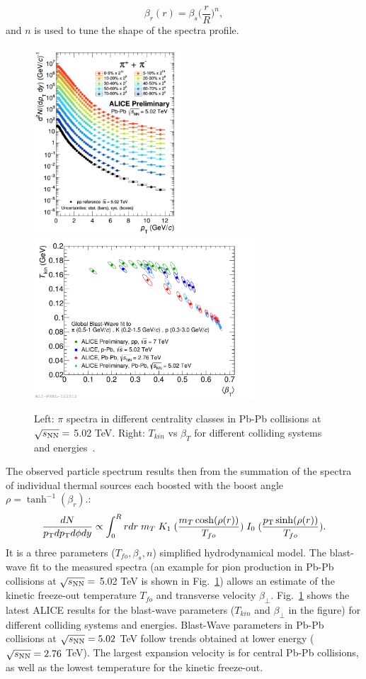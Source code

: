 \begin{equation}
\label{eq:Br}
\beta_r (r) = \beta_s \Big(\frac{r}{R}\Big )^n,
\end{equation}
and $n$ is used to tune the shape of the spectra profile.
\begin{figure}[!t]
  \centering
   \includegraphics[height=7cm]{FigCap1/PionsPbPb5TeV.png}
  \includegraphics[height=6cm]{FigCap1/BWfit_BetaTplot.pdf}
 \caption{Left: $\pi$ spectra in different centrality classes in Pb-Pb collisions at $\sqrt{s_{\rm NN}} = $ 5.02 TeV. Right: $T_{kin}$ vs $\beta_T$ for different colliding systems and energies~\cite{Jacazio:2017dvy}.}
  \label{fig:BWfit_BetaTplot}
\end{figure}
The observed particle spectrum results then from the summation of the spectra of individual thermal sources each boosted with the boost angle $\rho = \tanh^{-1}(\beta_r)$.:
\begin{equation}
\label{eq:BlastWave}
\frac{dN}{p_{\rm T} dp_{\rm T} d\phi dy}\propto \int_{0}^{R} r dr\;  m_{T}\;  K_{1} \; (\frac{m_{T} \cosh(\rho(r))}{T_{fo}})\;  I_{0}\; (\frac{p_{\rm T} \sinh(\rho(r))}{T_{fo}}).
\end{equation}
It is a three parameters ($T_{fo}, \beta_s, n$) simplified hydrodynamical model.
The blast-wave fit to the measured spectra (an example for pion production in Pb-Pb collisions at $\sqrt{s_{\rm NN}} = $ 5.02 TeV is shown in Fig.~\ref{fig:BWfit_BetaTplot}) allows an estimate of the kinetic freeze-out temperature $T_{fo}$ and transverse velocity $\beta_{\perp}$.
Fig.~\ref{fig:BWfit_BetaTplot} shows the latest ALICE results for the blast-wave parameters ($T_{kin}$ and $\beta_{\perp}$ in the figure) for different colliding systems and energies. Blast-Wave parameters in Pb-Pb collisions at $\sqrt{s_{\rm NN}} = 5.02$ TeV follow trends obtained at lower energy ($\sqrt{s_{\rm NN}} = 2.76$ TeV). The largest expansion velocity is for central Pb-Pb collisions, as well as the lowest temperature for the kinetic freeze-out.\\

